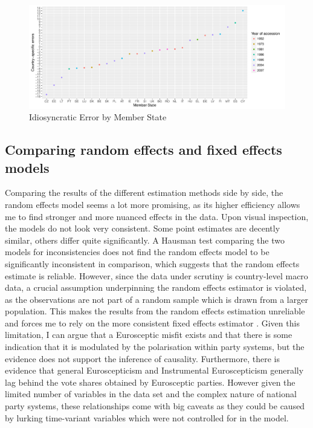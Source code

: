 \begin{landscape}
	\begin{figure}
		\centering
		\includegraphics[width=1.2\linewidth]{../../Analysis/Graphs/country-specific_error}
		\caption{Idiosyncratic Error by Member State}
		\label{fig: country-specific_error}
	\end{figure}
\end{landscape}

\subsection{Comparing random effects and fixed effects models}
Comparing the results of the different estimation methods side by side, the random effects model seems a lot more promising, as its higher efficiency allows me to find stronger and more nuanced effects in the data. Upon visual inspection, the models do not look very consistent. Some point estimates are decently similar, others differ quite significantly. A Hausman test comparing the two models for inconsistencies does not find the random effects model to be significantly inconsistent in comparison, which suggests that the random effects estimate is reliable. However, since the data under scrutiny is country-level macro data, a crucial assumption underpinning the random effects estimator is violated, as the observations are not part of a random sample which is drawn from a larger population. This makes the results  from the random effects estimation unreliable and forces me to rely on the more consistent fixed effects estimator \cite{Wooldridge2003}. Given this limitation, I can argue that a Eurosceptic misfit exists and that there is some indication that it is modulated by the polarisation within party systems, but the evidence does not support the inference of causality. Furthermore, there is evidence that  general Euroscepticism and Instrumental Euroscepticism generally lag behind the vote shares obtained by Eurosceptic parties. However given the limited number of variables in the data set and the complex nature of national party systems, these relationships come with big caveats as they could be caused by lurking time-variant variables which were not controlled for in the model. 

